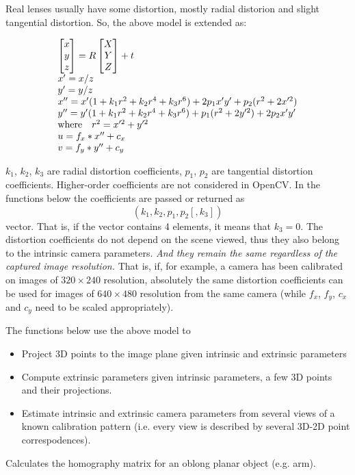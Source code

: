 Real lenses usually have some distortion, mostly
radial distorion and slight tangential distortion. So, the above model
is extended as:

\[
\begin{array}{l}
\begin{bmatrix} x\\ y\\ z \end{bmatrix} = R \begin{bmatrix} X\\ Y\\ Z \end{bmatrix} + t\\
x' = x/z\\
y' = y/z\\
x'' = x' (1 + k_1 r^2 + k_2 r^4 + k_3 r^6) + 2 p_1 x' y' + p_2(r^2 + 2 x'^2) \\
y'' = y' (1 + k_1 r^2 + k_2 r^4 + k_3 r^6) + p_1 (r^2 + 2 y'^2) + 2 p_2 x' y' \\
\text{where} \quad r^2 = x'^2 + y'^2 \\
u = f_x*x'' + c_x\\
v = f_y*y'' + c_y
\end{array}
\]

$k_1$, $k_2$, $k_3$ are radial distortion coefficients, $p_1$, $p_2$ are tangential distortion coefficients.
Higher-order coefficients are not considered in OpenCV. In the functions below the coefficients are passed or returned as
\label{k123p12}
\[ (k_1, k_2, p_1, p_2[, k_3]) \]vector. That is, if the vector contains 4 elements, it means that $k_3=0$.
The distortion coefficients do not depend on the scene viewed, thus they also belong to the intrinsic camera parameters.
\emph{And they remain the same regardless of the captured image resolution.}
That is, if, for example, a camera has been calibrated on images of $320
\times 240$ resolution, absolutely the same distortion coefficients can
be used for images of $640 \times 480$ resolution from the same camera (while $f_x$,
$f_y$, $c_x$ and $c_y$ need to be scaled appropriately).

The functions below use the above model to

\begin{itemize}
 \item Project 3D points to the image plane given intrinsic and extrinsic parameters
 \item Compute extrinsic parameters given intrinsic parameters, a few 3D points and their projections.
 \item Estimate intrinsic and extrinsic camera parameters from several views of a known calibration pattern (i.e. every view is described by several 3D-2D point correspodences).
\end{itemize}

\ifCPy

Calculates the homography matrix for an oblong planar object (e.g. arm).

